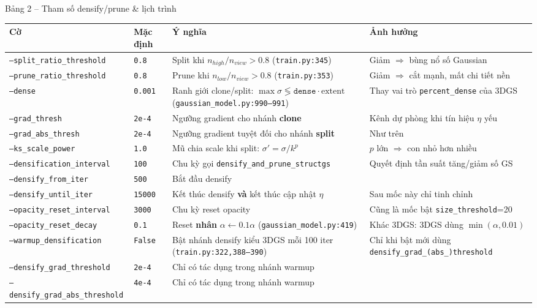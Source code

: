 \begin{frame}{Bảng 2 -- Tham số densify/prune \& lịch trình}
\scriptsize
\centering
\begin{tabular}{llp{4.4cm}p{3.2cm}}
\toprule
\textbf{Cờ} & \textbf{Mặc định} & \textbf{Ý nghĩa} & \textbf{Ảnh hưởng} \\
\midrule
\texttt{--split\_ratio\_threshold} & \texttt{0.8} & Split khi $n_{high}/n_{view} > 0.8$ (\texttt{train.py:345}) & Giảm $\Rightarrow$ bùng nổ số Gaussian \\
\texttt{--prune\_ratio\_threshold} & \texttt{0.8} & Prune khi $n_{low}/n_{view} > 0.8$ (\texttt{train.py:353}) & Giảm $\Rightarrow$ cắt mạnh, mất chi tiết nền \\
\texttt{--dense} & \texttt{0.001} & Ranh giới clone/split: $\max\sigma \lessgtr \texttt{dense}\cdot\text{extent}$ (\texttt{gaussian\_model.py:990--991}) & Thay vai trò \texttt{percent\_dense} của 3DGS \\
\texttt{--grad\_thresh} & \texttt{2e-4} & Ngưỡng gradient cho nhánh \textbf{clone} & Kênh dự phòng khi tín hiệu $\eta$ yếu \\
\texttt{--grad\_abs\_thresh} & \texttt{2e-4} & Ngưỡng gradient tuyệt đối cho nhánh \textbf{split} & Như trên \\
\texttt{--ks\_scale\_power} & \texttt{1.0} & Mũ chia scale khi split: $\sigma'=\sigma/k^{p}$ & $p$ lớn $\Rightarrow$ con nhỏ hơn nhiều \\
\texttt{--densification\_interval} & \texttt{100} & Chu kỳ gọi \texttt{densify\_and\_prune\_structgs} & Quyết định tần suất tăng/giảm số GS \\
\texttt{--densify\_from\_iter} & \texttt{500} & Bắt đầu densify & \\
\texttt{--densify\_until\_iter} & \texttt{15000} & Kết thúc densify \textbf{và} kết thúc cập nhật $\eta$ & Sau mốc này chỉ tinh chỉnh \\
\texttt{--opacity\_reset\_interval} & \texttt{3000} & Chu kỳ reset opacity & Cũng là mốc bật \texttt{size\_threshold}=20 \\
\texttt{--opacity\_reset\_decay} & \texttt{0.1} & Reset \textbf{nhân} $\alpha \leftarrow 0.1\alpha$ (\texttt{gaussian\_model.py:419}) & Khác 3DGS: 3DGS dùng $\min(\alpha,0.01)$ \\
\texttt{--warmup\_densification} & \texttt{False} & Bật nhánh densify kiểu 3DGS mỗi 100 iter (\texttt{train.py:322,388--390}) & Chỉ khi bật mới dùng \texttt{densify\_grad\_(abs\_)threshold} \\
\texttt{--densify\_grad\_threshold} & \texttt{2e-4} & \multicolumn{2}{p{7.8cm}}{Chỉ có tác dụng trong nhánh warmup} \\
\texttt{--densify\_grad\_abs\_threshold} & \texttt{4e-4} & \multicolumn{2}{p{7.8cm}}{Chỉ có tác dụng trong nhánh warmup} \\
\bottomrule
\end{tabular}
\end{frame}

